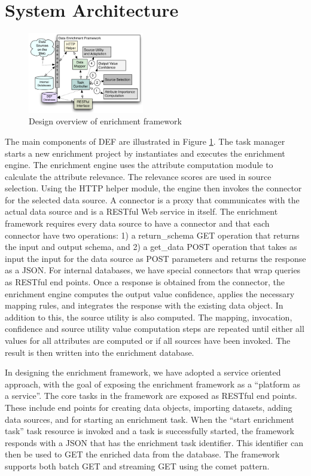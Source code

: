 \section{System Architecture}

\begin{figure}[htb]
\centering
\includegraphics[width=0.45\textwidth]{images/adef_arch.png}
\caption{Design overview of enrichment framework}
\label{fig:overview}
\end{figure}

The main components of DEF are illustrated in Figure \ref{fig:overview}. The task manager starts a new enrichment project by instantiates and executes the enrichment engine.
The enrichment engine uses the attribute computation module to calculate the attribute relevance. The relevance scores are used in source selection. Using the HTTP helper module, the engine then invokes 
the connector for the selected data source. A connector is a proxy that communicates with the actual data source and is a RESTful Web service in itself. The enrichment framework requires every data source to have a connector and 
that each connector have two operations: 1) a return\_schema GET operation that returns the input and output schema, and 2) a get\_data POST operation that takes as input the input for the data source as POST parameters and returns 
the response as a JSON. For internal databases, we have special connectors that wrap queries as RESTful end points. 
Once a response is obtained from the connector, the enrichment engine computes the output value confidence, applies the necessary mapping rules, and integrates the response with the existing data object. In 
addition to this, the source utility is also computed. The mapping, invocation, confidence and source utility value computation steps are repeated until either all values for all attributes are computed or if all sources
have been invoked. The result is then written into the enrichment database.  

In designing the enrichment framework, we have adopted a service oriented approach, with the goal of exposing the enrichment framework as a ``platform as a service''. 
The core tasks in the framework are exposed as RESTful end points. These include end points for 
creating data objects, importing datasets, adding data sources, and for starting an enrichment task. When the ``start enrichment task'' task resource is invoked and a task is successfully started, the framework responds with a JSON 
that has the enrichment task identifier. This identifier can then be used to GET the enriched data from the database. The framework supports both batch GET and streaming GET using the comet \cite{comet} pattern. 

